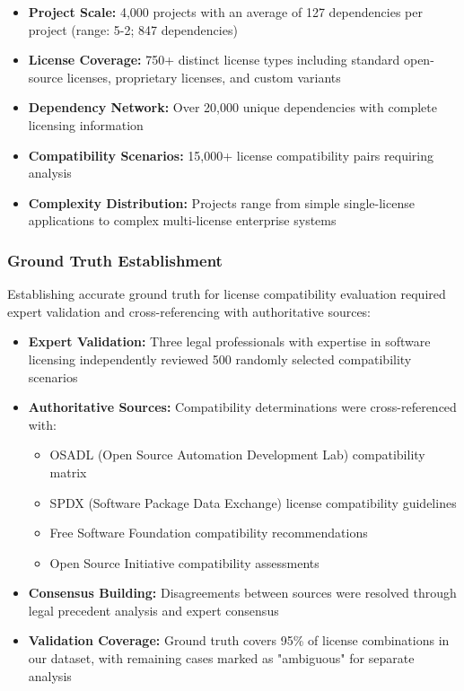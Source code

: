 \begin{itemize}
    \item \textbf{Project Scale:} 4,000 projects with an average of 127 dependencies per project (range: 5-2; 847 dependencies)
    \item \textbf{License Coverage:} 750+ distinct license types including standard open-source licenses, proprietary licenses, and custom variants
    \item \textbf{Dependency Network:} Over 20,000 unique dependencies with complete licensing information
    \item \textbf{Compatibility Scenarios:} 15,000+ license compatibility pairs requiring analysis
    \item \textbf{Complexity Distribution:} Projects range from simple single-license applications to complex multi-license enterprise systems
\end{itemize}

\subsubsection{Ground Truth Establishment}
Establishing accurate ground truth for license compatibility evaluation required expert validation and cross-referencing with authoritative sources:

\begin{itemize}
    \item \textbf{Expert Validation:} Three legal professionals with expertise in software licensing independently reviewed 500 randomly selected compatibility scenarios
    \item \textbf{Authoritative Sources:} Compatibility determinations were cross-referenced with:
    \begin{itemize}
        \item OSADL (Open Source Automation Development Lab) compatibility matrix
        \item SPDX (Software Package Data Exchange) license compatibility guidelines
        \item Free Software Foundation compatibility recommendations
        \item Open Source Initiative compatibility assessments
    \end{itemize}
    \item \textbf{Consensus Building:} Disagreements between sources were resolved through legal precedent analysis and expert consensus
    \item \textbf{Validation Coverage:} Ground truth covers 95\% of license combinations in our dataset, with remaining cases marked as "ambiguous" for separate analysis
\end{itemize}

